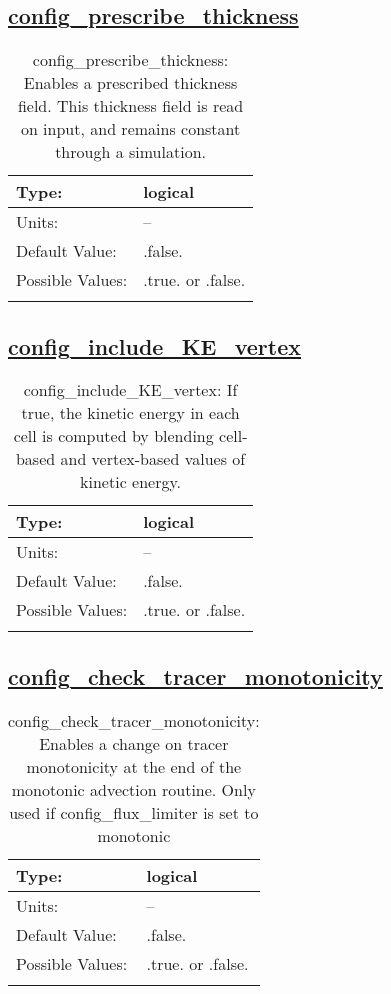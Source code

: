 \subsection[config\_prescribe\_thickness]{\hyperref[sec:nm_tab_debug]{config\_prescribe\_thickness}}
\label{subsec:nm_sec_config_prescribe_thickness}
\begin{center}
\begin{longtable}{| p{2.0in} || p{4.0in} |}
    \hline
    Type: & logical \\
    \hline
    Units: & -- \\
    \hline
    Default Value: & .false. \\
    \hline
    Possible Values: & .true. or .false. \\
    \hline
    \caption{config\_prescribe\_thickness: Enables a prescribed thickness field. This thickness field is read on input, and remains constant through a simulation.}
\end{longtable}
\end{center}
\subsection[config\_include\_KE\_vertex]{\hyperref[sec:nm_tab_debug]{config\_include\_KE\_vertex}}
\label{subsec:nm_sec_config_include_KE_vertex}
\begin{center}
\begin{longtable}{| p{2.0in} || p{4.0in} |}
    \hline
    Type: & logical \\
    \hline
    Units: & -- \\
    \hline
    Default Value: & .false. \\
    \hline
    Possible Values: & .true. or .false. \\
    \hline
    \caption{config\_include\_KE\_vertex: If true, the kinetic energy in each cell is computed by blending cell-based and vertex-based values of kinetic energy.}
\end{longtable}
\end{center}
\subsection[config\_check\_tracer\_monotonicity]{\hyperref[sec:nm_tab_debug]{config\_check\_tracer\_monotonicity}}
\label{subsec:nm_sec_config_check_tracer_monotonicity}
\begin{center}
\begin{longtable}{| p{2.0in} || p{4.0in} |}
    \hline
    Type: & logical \\
    \hline
    Units: & -- \\
    \hline
    Default Value: & .false. \\
    \hline
    Possible Values: & .true. or .false. \\
    \hline
    \caption{config\_check\_tracer\_monotonicity: Enables a change on tracer monotonicity at the end of the monotonic advection routine. Only used if config\_flux\_limiter is set to monotonic}
\end{longtable}
\end{center}
